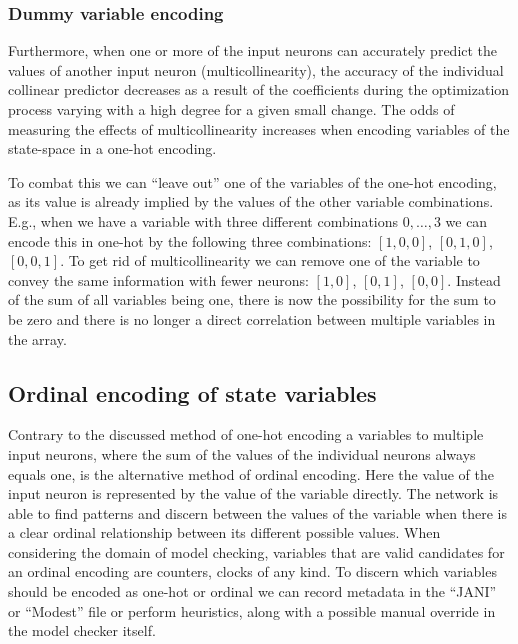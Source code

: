 \subsubsection{Dummy variable encoding}

Furthermore, when one or more of the input neurons can accurately predict the values of another input neuron (multicollinearity), the accuracy of the individual collinear predictor decreases as a result of the coefficients during the optimization process varying with a high degree for a given small change. The odds of measuring the effects of multicollinearity increases when encoding variables of the state-space in a one-hot encoding.

To combat this we can ``leave out'' one of the variables of the one-hot encoding, as its value is already implied by the values of the other variable combinations. E.g., when we have a variable with three different combinations $0, \dots, 3$ we can encode this in one-hot by the following three combinations: $[1, 0, 0]$, $[0, 1, 0]$, $[0, 0, 1]$. To get rid of multicollinearity we can remove one of the variable to convey the same information with fewer neurons: $[1, 0]$, $[0, 1]$, $[0, 0]$. Instead of the sum of all variables being one, there is now the possibility for the sum to be zero and there is no longer a direct correlation between multiple variables in the array.

\subsection{Ordinal encoding of state variables}

Contrary to the discussed method of one-hot encoding a variables to multiple input neurons, where the sum of the values of the individual neurons always equals one, is the alternative method of ordinal encoding. Here the value of the input neuron is represented by the value of the variable directly. The network is able to find patterns and discern between the values of the variable when there is a clear ordinal relationship between its different possible values. When considering the domain of model checking, variables that are valid candidates for an ordinal encoding are counters, clocks of any kind. To discern which variables should be encoded as one-hot or ordinal we can record metadata in the ``JANI'' or ``Modest'' file or perform heuristics, along with a possible manual override in the model checker itself.